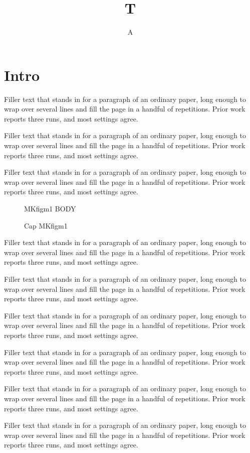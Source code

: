 \documentclass{article}
\title{T}\author{A}
\begin{document}
\section{Intro}
Filler text that stands in for a paragraph of an ordinary paper, long enough to wrap over several lines and fill the page in a handful of repetitions. Prior work reports three runs, and most settings agree.\par
Filler text that stands in for a paragraph of an ordinary paper, long enough to wrap over several lines and fill the page in a handful of repetitions. Prior work reports three runs, and most settings agree.\par
Filler text that stands in for a paragraph of an ordinary paper, long enough to wrap over several lines and fill the page in a handful of repetitions. Prior work reports three runs, and most settings agree.\par
\begin{figure}[t]\centering MKfigm1 BODY\caption{Cap MKfigm1}\label{fig:m1}\end{figure}
Filler text that stands in for a paragraph of an ordinary paper, long enough to wrap over several lines and fill the page in a handful of repetitions. Prior work reports three runs, and most settings agree.\par
Filler text that stands in for a paragraph of an ordinary paper, long enough to wrap over several lines and fill the page in a handful of repetitions. Prior work reports three runs, and most settings agree.\par
Filler text that stands in for a paragraph of an ordinary paper, long enough to wrap over several lines and fill the page in a handful of repetitions. Prior work reports three runs, and most settings agree.\par
Filler text that stands in for a paragraph of an ordinary paper, long enough to wrap over several lines and fill the page in a handful of repetitions. Prior work reports three runs, and most settings agree.\par
Filler text that stands in for a paragraph of an ordinary paper, long enough to wrap over several lines and fill the page in a handful of repetitions. Prior work reports three runs, and most settings agree.\par
Filler text that stands in for a paragraph of an ordinary paper, long enough to wrap over several lines and fill the page in a handful of repetitions. Prior work reports three runs, and most settings agree.\par
\end{document}
